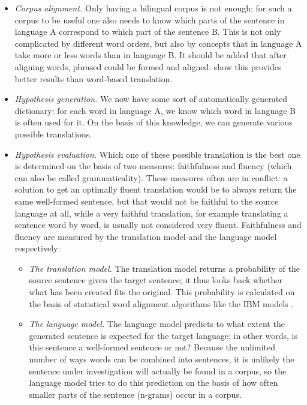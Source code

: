 \documentclass[12pt]{article}
\begin{document}
\begin{itemize}
\item \emph{Corpus alignment.} Only having a bilingual corpus is not enough: for such a corpus to be useful one also needs to know which parts of the sentence in language A correspond to which part of the sentence B. This is not only complicated by different word orders, but also by concepts that in language A take more or less words than in language B. It should be added that after aligning words, phrased could be formed and aligned. \citet{koehn03} show this provides better results than word-based translation.

\item \emph{Hypothesis generation.} We now have some sort of automatically generated dictionary: for each word in language A, we know which word in language B is often used for it. On the basis of this knowledge, we can generate various possible translations. 

\item \emph{Hypothesis evaluation.} Which one of these possible translation is the best one is determined on the basis of two measures: faithfulness and fluency (which can also be called grammaticality). These measures often are in conflict: a solution to get an optimally fluent translation would be to always return the same well-formed sentence, but that would not be faithful to the source language at all, while a very faithful translation, for example translating a sentence word by word, is usually not considered very fluent. Faithfulness and fluency are measured by the translation model and the language model respectively:

\begin{itemize}
\item \emph{The translation model.} The translation model returns a probability of the source sentence given the target sentence; it thus looks back whether what has been created fits the original. This probability is calculated on the basis of statistical word alignment algorithms like the IBM models \citep{brown93}.

\item \emph{The language model.} The language model predicts to what extent the generated sentence is expected for the target language; in other words, is this sentence a well-formed sentence or not? Because the unlimited number of ways words can be combined into sentences, it is unlikely the sentence under investigation will actually be found in a corpus, so the language model tries to do this prediction on the basis of how often smaller parts of the sentence (n-grams) occur in a corpus.

\end{itemize}

\end{itemize}
\end{document}

